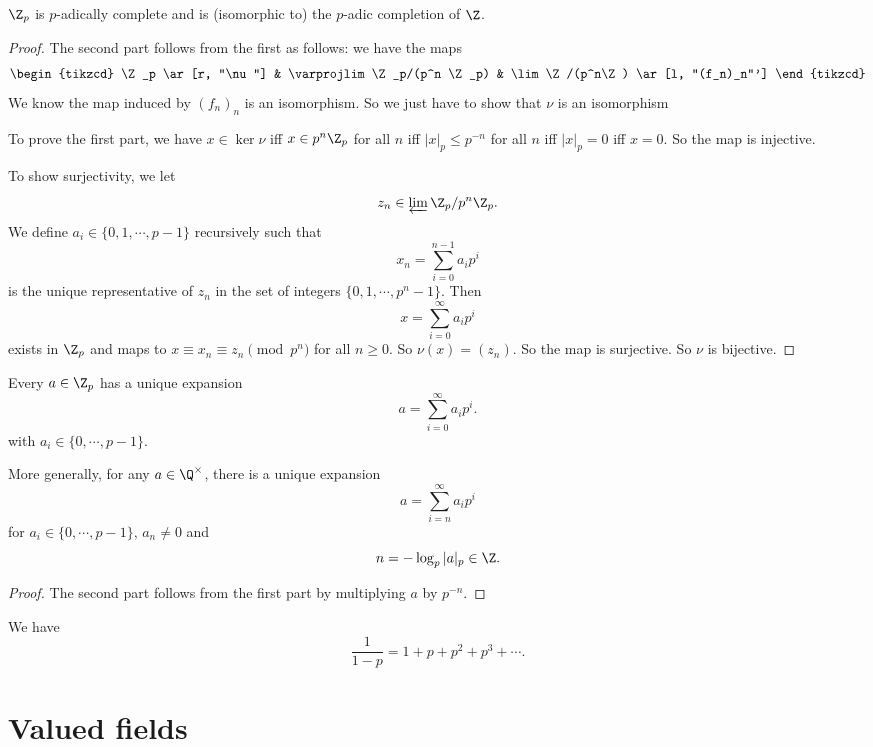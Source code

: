 \documentclass[a4paper]{article}
\begin{document}
\begin{prop}
  $\Z_p$ is $p$-adically complete and is (isomorphic to) the $p$-adic completion of $\Z$.
\end{prop}

\begin{proof}
  The second part follows from the first as follows: we have the maps
  \[
    \begin{tikzcd}
      \Z_p \ar[r, "\nu"] & \varprojlim \Z_p/(p^n \Z_p) & \lim \Z/(p^n\Z) \ar[l, "(f_n)_n"']
    \end{tikzcd}
  \]
  We know the map induced by $(f_n)_n$ is an isomorphism. So we just have to show that $\nu$ is an isomorphism

  To prove the first part, we have $x \in \ker \nu$ iff $x \in p^n \Z_p$ for all $n$ iff $|x|_p \leq p^{-n}$ for all $n$ iff $|x|_p = 0$ iff $x = 0$. So the map is injective.

  To show surjectivity, we let
  \[
    z_n \in \varprojlim \Z_p/p^n \Z_p.
  \]
  We define $a_i \in \{0, 1, \cdots, p - 1\}$ recursively such that
  \[
    x_n = \sum_{i = 0}^{n - 1} a_i p^i
  \]
  is the unique representative of $z_n$ in the set of integers $\{0, 1, \cdots, p^n - 1\}$. Then
  \[
    x = \sum_{i = 0}^\infty a_i p^i
  \]
  exists in $\Z_p$ and maps to $x \equiv x_n \equiv z_n \pmod{p^n}$ for all $n \geq 0$. So $\nu(x) = (z_n)$. So the map is surjective. So $\nu$ is bijective.
\end{proof}

\begin{cor}
  Every $a \in \Z_p$ has a unique expansion
  \[
    a = \sum_{i = 0}^\infty a_i p^i.
  \]
  with $a_i \in \{0, \cdots, p - 1\}$.

  More generally, for any $a \in \Q^\times$, there is a unique expansion
  \[
    a = \sum_{i = n}^\infty a_i p^i
  \]
  for $a_i \in \{0, \cdots, p - 1\}$, $a_n \not= 0$ and
  \[
    n = - \log_p |a|_p \in \Z.
  \]
\end{cor}

\begin{proof}
  The second part follows from the first part by multiplying $a$ by $p^{-n}$.
\end{proof}

\begin{eg}
  We have
  \[
    \frac{1}{1 - p} = 1 + p + p^2 + p^3 + \cdots.
  \]
\end{eg}

\section{Valued fields}
\end{document}
